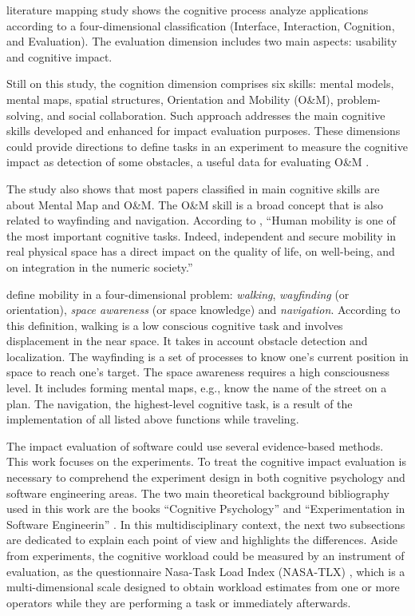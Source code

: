  literature mapping study shows the cognitive process analyze applications according to a four-dimensional classification (Interface, Interaction, Cognition, and Evaluation). The evaluation dimension includes two main aspects: usability and cognitive impact. 


Still on this study, the cognition dimension comprises six skills: mental models, mental maps, spatial structures, Orientation and Mobility (O\&M), problem-solving, and social collaboration. Such approach addresses the main cognitive skills developed and enhanced for impact evaluation purposes. These dimensions could provide directions to define tasks in an experiment to measure the cognitive impact as detection of some obstacles, a useful data for evaluating O\&M \cite{Pissaloux2018a}. 

The study also shows that most papers classified in main cognitive skills are about Mental Map and O\&M. The O\&M skill is a broad concept that is also related to wayfinding and navigation. According to , ``Human mobility is one of the most important cognitive tasks. Indeed, independent and secure mobility in real physical space has a direct impact on the quality of life, on well-being, and on integration in the numeric society.''

 define mobility in a four-dimensional problem: \textit{walking}, \textit{wayfinding} (or orientation), \textit{space awareness} (or space knowledge) and \textit{navigation}. According to this definition, walking is a low conscious cognitive task and involves displacement in the near space. It takes in account obstacle detection and localization. The wayfinding is a set of processes to know one’s current position in space to reach one’s target. The space awareness requires a high consciousness level. It includes forming mental maps, e.g., know the name of the street on a plan. The navigation, the highest-level cognitive task, is a result of the implementation of all listed above functions while traveling.

The impact evaluation of software could use several evidence-based methods. This work focuses on the experiments. To treat the cognitive impact evaluation is necessary to comprehend the experiment design in both cognitive psychology and software engineering areas. The two main theoretical background bibliography used in this work are the books ``Cognitive Psychology'' \cite{Sternberg2011} and ``Experimentation in Software Engineerin'' \cite{Wohlin2000}. In this multidisciplinary context, the next two subsections are dedicated to explain each point of view and highlights the differences. Aside from experiments, the cognitive workload could be measured by an instrument of evaluation, as the questionnaire Nasa-Task Load Index (NASA-TLX) \cite{Hart2006Nasa-TaskLater}, which is a multi-dimensional scale designed to obtain workload estimates from one or more operators while they are performing a task or immediately afterwards.


